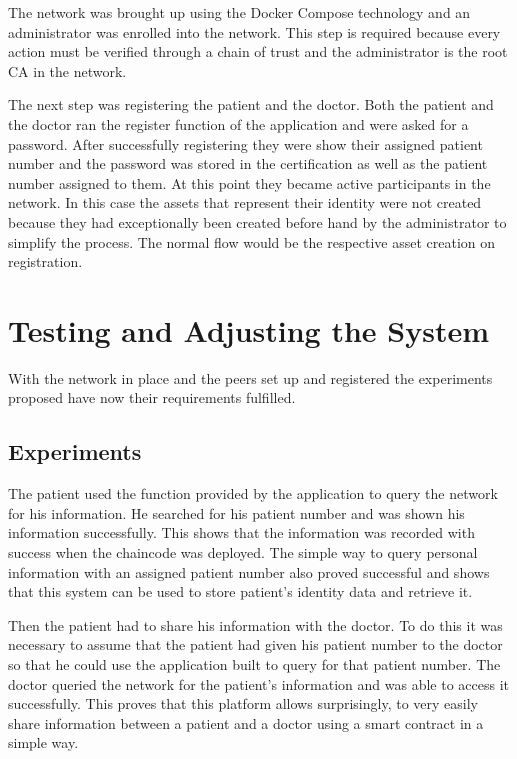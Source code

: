 The network was brought up using the Docker Compose technology and an
administrator was enrolled into the network. This step is required because
every action must be verified through a chain of trust and the administrator is
the root CA in the network.

The next step was registering the patient and the doctor. Both the patient and
the doctor ran the register function of the application and were asked for a
password. After successfully registering they were show their assigned patient
number and the password was stored in the certification as well as the patient
number assigned to them. At this point they became active participants in the
network. In this case the assets that represent their identity were not created
because they had exceptionally been created before hand by the administrator to
simplify the process. The normal flow would be the respective asset creation on
registration.

\section{Testing and Adjusting the System}

With the network in place and the peers set up and registered the experiments
proposed have now their requirements fulfilled.

\subsection{Experiments}
The patient used the function provided by the application to query the network
for his information. He searched for his patient number and was shown his
information successfully. This shows that the information was recorded with
success when the chaincode was deployed. The simple way to query personal
information with an assigned patient number also proved successful and shows
that this system can be used to store patient's identity data and retrieve it.

Then the patient had to share his information with the doctor. To do this it
was necessary to assume that the patient had given his patient number to the
doctor so that he could use the application built to query for that patient
number. The doctor queried the network for the patient's information and was
able to access it successfully. This proves that this platform allows
surprisingly, to very easily share information between a patient and a doctor
using a smart contract in a simple way.

